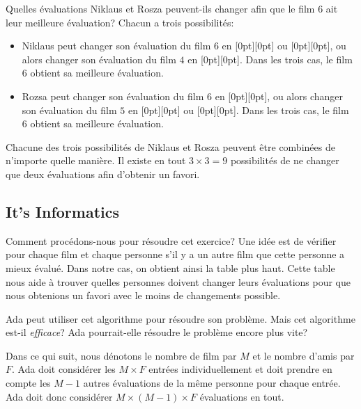 \documentclass[a4paper,11pt]{report}
\newcommand{\taskGraphicsFolder}{..}
\begin{document}
Quelles évaluations Niklaus et Rosza peuvent-ils changer afin que le film $6$ ait leur meilleure évaluation? Chacun a trois possibilités:

\begin{itemize}
  \item Niklaus peut changer son évaluation du film $6$ en \raisebox{-0.5ex}[0pt][0pt]{} ou \raisebox{-0.5ex}[0pt][0pt]{}, ou alors changer son évaluation du film $4$ en \raisebox{-0.5ex}[0pt][0pt]{}. Dans les trois cas, le film $6$ obtient sa meilleure évaluation.
  \item Rozsa peut changer son évaluation du film $6$ en \raisebox{-0.5ex}[0pt][0pt]{}, ou alors changer son évaluation du film $5$ en \raisebox{-0.5ex}[0pt][0pt]{} ou \raisebox{-0.5ex}[0pt][0pt]{}. Dans les trois cas, le film $6$ obtient sa meilleure évaluation.
\end{itemize}

Chacune des trois possibilités de Niklaus et Rosza peuvent être combinées de n’importe quelle manière. Il existe en tout ${3 \times 3 = 9}$ possibilités de ne changer que deux évaluations afin d’obtenir un favori.


\subsection*{It’s Informatics}

Comment procédons-nous pour résoudre cet exercice? Une idée est de vérifier pour chaque film et chaque personne s’il y a un autre film que cette personne a mieux évalué. Dans notre cas, on obtient ainsi la table plus haut. Cette table nous aide à trouver quelles personnes doivent changer leurs évaluations pour que nous obtenions un favori avec le moins de changements possible.

Ada peut utiliser cet algorithme pour résoudre son problème. Mais cet algorithme est-il \emph{efficace}? Ada pourrait-elle résoudre le problème encore plus vite?

Dans ce qui suit, nous dénotons le nombre de film par ${M}$ et le nombre d’amis par ${F}$. Ada doit considérer les ${M \times F}$ entrées individuellement et doit prendre en compte les ${M-1}$ autres évaluations de la même personne pour chaque entrée. Ada doit donc considérer ${M \times (M-1) \times F}$ évaluations en tout.
\end{document}
